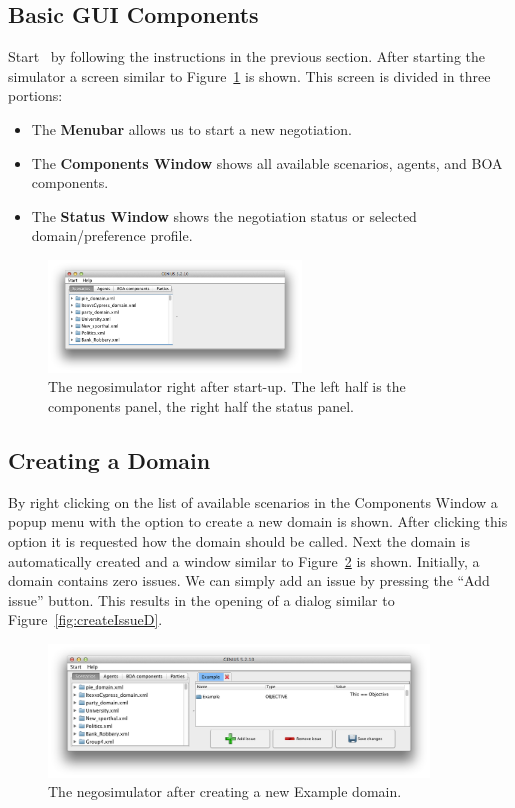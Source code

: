 \documentclass[]{article}
\begin{document}
\subsection{Basic GUI Components}
Start \Genius~by following the instructions in the previous section. After starting the simulator a screen similar to Figure~\ref{Fig:negosimulator start} is shown. This screen is divided in three portions:

\begin{itemize}
	\item The \textbf{Menubar} allows us to start a new negotiation.
	\item The \textbf{Components Window} shows all available scenarios, agents, and BOA components.
	\item The \textbf{Status Window} shows the negotiation status or selected domain/preference profile.
\end{itemize}

\begin{figure}[htb]
	\centering
	\includegraphics[width=0.6\textwidth]{media/start.png}
\caption{The negosimulator right after start-up. The left half is the components panel, the right half the status panel.}\label{Fig:negosimulator start}
\end{figure}

\subsection{Creating a Domain}
By right clicking on the list of available scenarios in the Components Window a popup menu with the option to create a new domain is shown. After clicking this option it is requested how the domain should be called. Next the domain is automatically created and a window similar to Figure~\ref{Fig:newdomain} is shown. Initially, a domain contains zero issues. We can simply add an issue by pressing the ``Add issue'' button. This results in the opening of a dialog similar to Figure~\ref{fig:createIssueD}.

\begin{figure}[htb]
	\centering
	\includegraphics[width=0.9\textwidth]{media/exampledomain.png}
\caption{The negosimulator after creating a new Example domain.}\label{Fig:newdomain}
\end{figure}
\end{document}
